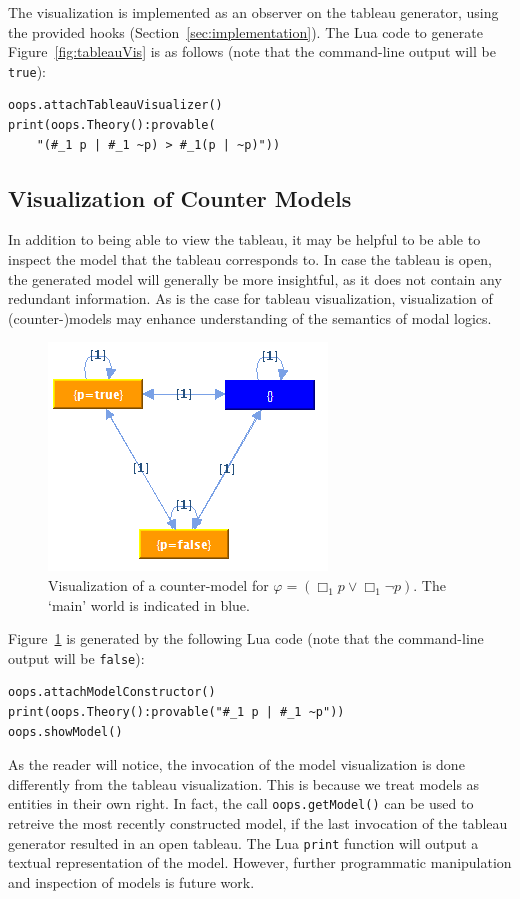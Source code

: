 The visualization is implemented as an observer on the tableau generator,
using the provided hooks (Section~\ref{sec:implementation}).
The Lua code to generate
Figure~\ref{fig:tableauVis} is as follows (note that the command-line output
will be \lstinline!true!):
\begin{lstlisting}
oops.attachTableauVisualizer()
print(oops.Theory():provable(
	"(#_1 p | #_1 ~p) > #_1(p | ~p)"))
\end{lstlisting}

\subsection{Visualization of Counter Models}

In addition to being able to view the tableau, it may be helpful to be able to
inspect the model that the tableau corresponds to.
In case the tableau is open, the generated model will generally be more
insightful, as it does not contain any redundant information.
As is the case for tableau visualization, visualization of (counter-)models may
enhance understanding of the semantics of modal logics.

\begin{figure}[p]
\centering
\includegraphics[scale=.55]{images/modelVis}
\caption{Visualization of a counter-model for $\varphi = (\Box_1 p \vee \Box_1
\neg p)$. The `main' world is indicated in blue.}
\label{fig:modelVis}
\end{figure}

Figure~\ref{fig:modelVis} is generated by the following Lua code (note that
the command-line output will be \lstinline!false!):
\begin{lstlisting}
oops.attachModelConstructor()
print(oops.Theory():provable("#_1 p | #_1 ~p"))
oops.showModel() 
\end{lstlisting}
As the reader will notice, the invocation of the model visualization is done
differently from the tableau visualization.
This is because we treat models as entities in their own right.
In fact, the call \lstinline!oops.getModel()!  can be used to retreive the most
recently constructed model, if the last invocation of the tableau generator
resulted in an open tableau.
The Lua \lstinline!print! function will output a textual representation of the
model.
However, further programmatic manipulation and inspection of models is future
work.
